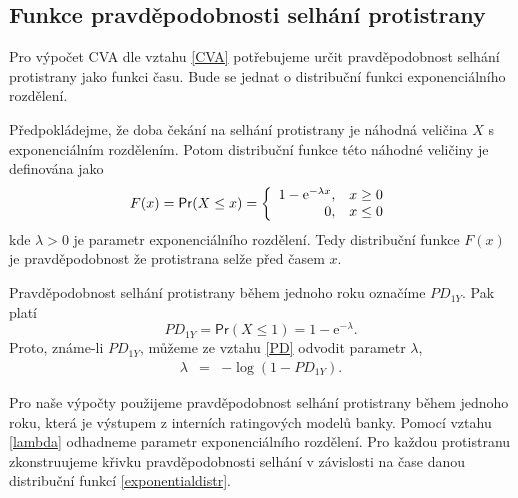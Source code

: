 \documentclass[a4paper,12pt]{report}
\theoremstyle{definition} \newtheorem{definice}[veta]{Definice}
\theoremstyle{remark}
\begin{document}
\subsection{Funkce pravděpodobnosti selhání protistrany}\label{funkce_PD_kap}
Pro výpočet CVA dle vztahu \eqref{CVA} potřebujeme určit pravděpodobnost selhání protistrany jako funkci času.
Bude se jednat o distribuční funkci exponenciálního rozdělení.

Předpokládejme, že doba čekání na selhání protistrany je náhodná veličina $X$ s exponenciálním rozdělením.
Potom distribuční funkce této náhodné veličiny je definována jako
\begin{equation}\label{exponentialdistr}
F(x)= \mathsf{Pr}(X\leq x)= \left\{ \begin{array}{r@{\quad}c}
    1-\mathrm{e}^{-\lambda x}, & x \geq 0 \\
    0, & x \leq 0 \\ \end{array} \right.
\end{equation}
kde $\lambda>0$ je parametr exponenciálního rozdělení.
Tedy distribuční funkce $F(x)$ je pravděpodobnost že protistrana selže před časem $x$.

Pravděpodobnost selhání protistrany během jednoho roku označíme $PD_{1Y}$.
Pak platí
\begin{equation}\label{PD}
PD_{1Y}=\mathsf{Pr}(X\leq 1)=1-\mathrm{e}^{-\lambda}.
\end{equation}
Proto, známe-li $PD_{1Y}$, můžeme ze vztahu \eqref{PD} odvodit parametr $\lambda$,
\begin{eqnarray}\label{lambda}
\lambda&=&-\log(1-PD_{1Y}).
\end{eqnarray}

Pro naše výpočty použijeme pravděpodobnost selhání protistrany během jednoho roku, která je výstupem z interních ratingových modelů banky.
Pomocí vztahu \eqref{lambda} odhadneme parametr exponenciálního rozdělení. 
Pro každou protistranu zkonstruujeme křivku pravděpodobnosti selhání v závislosti na čase danou distribuční funkcí \eqref{exponentialdistr}.
\end{document}
